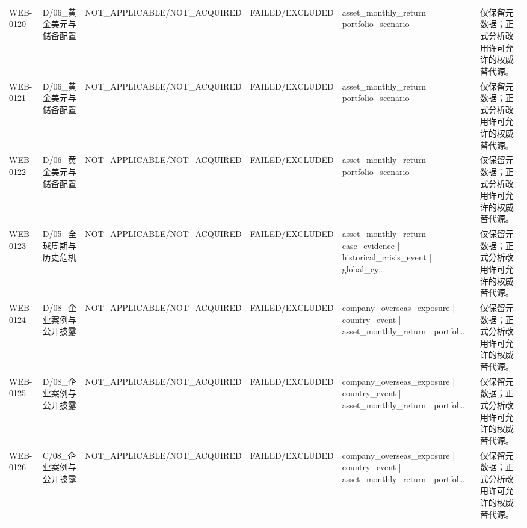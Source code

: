 \begin{landscape}
\begin{longtable}{p{1.8cm}p{2.6cm}p{2.6cm}p{2.6cm}p{4.8cm}p{7.2cm}}
WEB-0120 & D/\allowbreak{}06\_\allowbreak{}黄金美元与储备配置 & NOT\_\allowbreak{}APPLICABLE/\allowbreak{}NOT\_\allowbreak{}ACQUIRED & FAILED/\allowbreak{}EXCLUDED & asset\_\allowbreak{}monthly\_\allowbreak{}return | portfolio\_\allowbreak{}scenario & 仅保留元数据；正式分析改用许可允许的权威替代源。\\
WEB-0121 & D/\allowbreak{}06\_\allowbreak{}黄金美元与储备配置 & NOT\_\allowbreak{}APPLICABLE/\allowbreak{}NOT\_\allowbreak{}ACQUIRED & FAILED/\allowbreak{}EXCLUDED & asset\_\allowbreak{}monthly\_\allowbreak{}return | portfolio\_\allowbreak{}scenario & 仅保留元数据；正式分析改用许可允许的权威替代源。\\
WEB-0122 & D/\allowbreak{}06\_\allowbreak{}黄金美元与储备配置 & NOT\_\allowbreak{}APPLICABLE/\allowbreak{}NOT\_\allowbreak{}ACQUIRED & FAILED/\allowbreak{}EXCLUDED & asset\_\allowbreak{}monthly\_\allowbreak{}return | portfolio\_\allowbreak{}scenario & 仅保留元数据；正式分析改用许可允许的权威替代源。\\
WEB-0123 & D/\allowbreak{}05\_\allowbreak{}全球周期与历史危机 & NOT\_\allowbreak{}APPLICABLE/\allowbreak{}NOT\_\allowbreak{}ACQUIRED & FAILED/\allowbreak{}EXCLUDED & asset\_\allowbreak{}monthly\_\allowbreak{}return | case\_\allowbreak{}evidence | historical\_\allowbreak{}crisis\_\allowbreak{}event | global\_\allowbreak{}cy… & 仅保留元数据；正式分析改用许可允许的权威替代源。\\
WEB-0124 & D/\allowbreak{}08\_\allowbreak{}企业案例与公开披露 & NOT\_\allowbreak{}APPLICABLE/\allowbreak{}NOT\_\allowbreak{}ACQUIRED & FAILED/\allowbreak{}EXCLUDED & company\_\allowbreak{}overseas\_\allowbreak{}exposure | country\_\allowbreak{}event | asset\_\allowbreak{}monthly\_\allowbreak{}return | portfol… & 仅保留元数据；正式分析改用许可允许的权威替代源。\\
WEB-0125 & D/\allowbreak{}08\_\allowbreak{}企业案例与公开披露 & NOT\_\allowbreak{}APPLICABLE/\allowbreak{}NOT\_\allowbreak{}ACQUIRED & FAILED/\allowbreak{}EXCLUDED & company\_\allowbreak{}overseas\_\allowbreak{}exposure | country\_\allowbreak{}event | asset\_\allowbreak{}monthly\_\allowbreak{}return | portfol… & 仅保留元数据；正式分析改用许可允许的权威替代源。\\
WEB-0126 & C/\allowbreak{}08\_\allowbreak{}企业案例与公开披露 & NOT\_\allowbreak{}APPLICABLE/\allowbreak{}NOT\_\allowbreak{}ACQUIRED & FAILED/\allowbreak{}EXCLUDED & company\_\allowbreak{}overseas\_\allowbreak{}exposure | country\_\allowbreak{}event | asset\_\allowbreak{}monthly\_\allowbreak{}return | portfol… & 仅保留元数据；正式分析改用许可允许的权威替代源。\\

\end{longtable}
\end{landscape}
